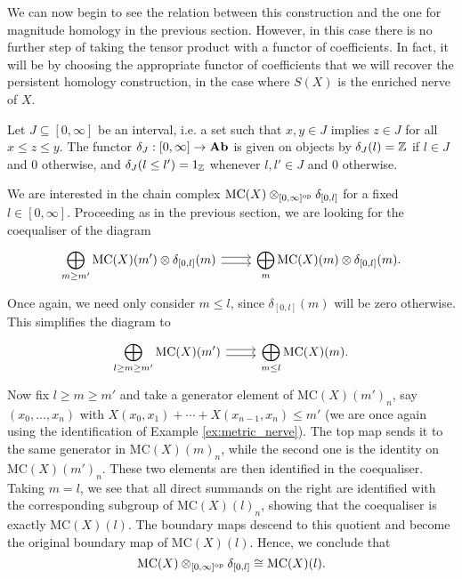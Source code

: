 We can now begin to see the relation between this construction and the one for magnitude homology in the previous section. However, in this case there is no further step of taking the tensor product with a functor of coefficients. In fact, it will be by choosing the appropriate functor of coefficients that we will recover the persistent homology construction, in the case where $S(X)$ is the enriched nerve of $X$.

\begin{definition}
    Let $J \subseteq [0,\infty]$ be an interval, i.e. a set such that $x,y \in J$ implies $z \in J$ for all $x \leq z \leq y$. The functor $\delta_J : [0,\infty] \to \mathbf{Ab}$ is given on objects by $\delta_J(l) = \mathbb{Z}$ if $l \in J$ and $0$ otherwise, and $\delta_J(l \leq l') = 1_{\mathbb{Z}}$ whenever $l, l' \in J$ and $0$ otherwise.
\end{definition}

We are interested in the chain complex $\mathrm{MC}(X) \otimes_{[0,\infty]^{\mathrm{op}}} \delta_{[0,l]}$ for a fixed $l \in [0,\infty]$. Proceeding as in the previous section, we are looking for the coequaliser of the diagram
\begin{equation}\label{eq:blurred_coeq}
\begin{tikzcd}
    \displaystyle \bigoplus_{m \geq m'} \mathrm{MC}(X)(m') \otimes \delta_{[0,l]}(m) \ar[r, shift left] \ar[r, shift right] &
    \displaystyle \bigoplus_{m} \mathrm{MC}(X)(m) \otimes \delta_{[0,l]}(m).
\end{tikzcd}
\end{equation}
Once again, we need only consider $m \leq l$, since $\delta_{[0,l]}(m)$ will be zero otherwise. This simplifies the diagram to
\[\begin{tikzcd}
    \displaystyle \bigoplus_{l \geq m \geq m'} \mathrm{MC}(X)(m') \ar[r, shift left] \ar[r, shift right] &
    \displaystyle \bigoplus_{m \leq l} \mathrm{MC}(X)(m).
\end{tikzcd}\]
Now fix $l \geq m \geq m'$ and take a generator element of $\mathrm{MC}(X)(m')_n$, say $(x_0,\dots,x_n)$ with $X(x_0,x_1) + \cdots + X(x_{n-1},x_n) \leq m'$ (we are once again using the identification of Example \ref{ex:metric_nerve}). The top map sends it to the same generator in $\mathrm{MC}(X)(m)_n$, while the second one is the identity on $\mathrm{MC}(X)(m')_n$. These two elements are then identified in the coequaliser. Taking $m = l$, we see that all direct summands on the right are identified with the corresponding subgroup of $\mathrm{MC}(X)(l)_n$, showing that the coequaliser is exactly $\mathrm{MC}(X)(l)$. The boundary maps descend to this quotient and become the original boundary map of $\mathrm{MC}(X)(l)$. Hence, we conclude that 
\[\mathrm{MC}(X) \otimes_{[0,\infty]^{\mathrm{op}}} \delta_{[0,l]} \cong \mathrm{MC}(X)(l).\]

